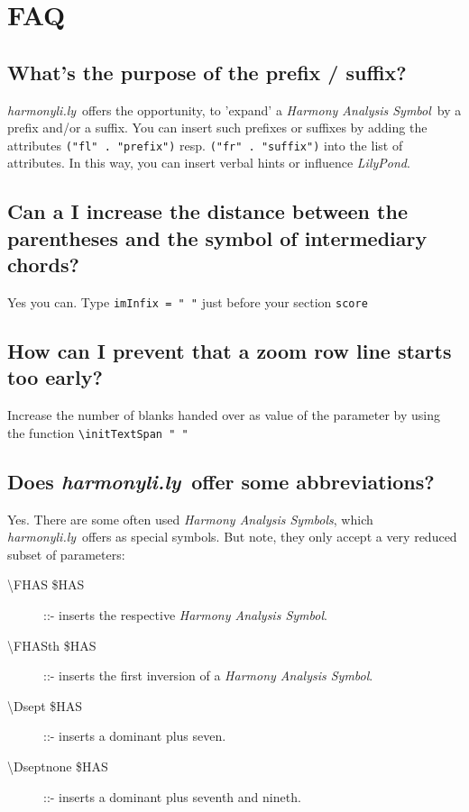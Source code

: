 \documentclass[
  DIV=calc,
  BCOR=5mm,
  12pt,
  headings=small,
  oneside,
  abstract=true,
  toc=bib,
  xcolor=dvipsnames,
  openany,
  ngerman,english]{scrartcl}
\newcommand{\hlyn}[0]{\textit{harmonyli.ly}}
\newcommand{\lily}[0]{\textit{LilyPond}}
\newcommand{\has}[1]{\textit{Harmony Analysis Symbol#1}}
\begin{document}
\section{FAQ}
\label{FAQ}
\subsection{What's the purpose of the prefix / suffix?}

\hlyn\ offers the opportunity, to 'expand' a \has{}\ by a prefix and/or a
suffix. You can insert such prefixes or suffixes by adding the attributes
\texttt{("fl" . "prefix")} resp. \texttt{("fr" . "suffix")} into the list of
attributes. In this way, you can insert verbal hints or influence \lily.

\subsection{Can a I increase the distance between the parentheses and the symbol of intermediary chords?}

Yes you can. Type \texttt{imInfix = " "} just before your section \texttt{score}

\subsection{How can I prevent that a zoom row line starts too early?}

Increase the number of blanks handed over as value of the parameter by using the
function \texttt{\textbackslash initTextSpan "      "}

\subsection{Does \hlyn\ offer some abbreviations?}

Yes. There are some often used \has{s}, which \hlyn\ offers as special symbols.
But note, they only accept a very reduced subset of parameters:

\begin{description}
  \item[\textbackslash FHAS \$HAS] ::- inserts the respective \has{}.
  \item[\textbackslash FHASth \$HAS] ::- inserts the first inversion of a \has{}.
  \item[\textbackslash Dsept \$HAS] ::- inserts a dominant plus seven.
  \item[\textbackslash Dseptnone \$HAS] ::- inserts a dominant plus seventh and nineth.
\end{description}
\end{document}
